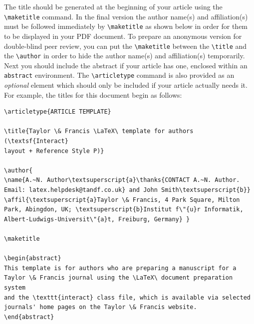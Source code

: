 \documentclass[]{interact}
\theoremstyle{plain}%
\theoremstyle{definition}
\theoremstyle{remark}
\begin{document}
The title should be generated at the beginning of your article using the \verb"\maketitle" command.
In the final version the author name(s) and affiliation(s) must be followed immediately by \verb"\maketitle" as shown below in order for them to be displayed in your PDF document.
To prepare an anonymous version for double-blind peer review, you can put the \verb"\maketitle" between the \verb"\title" and the \verb"\author" in order to hide the author name(s) and affiliation(s) temporarily.
Next you should include the abstract if your article has one, enclosed within an \texttt{abstract} environment.
The \verb"\articletype" command is also provided as an \emph{optional} element which should only be included if your article actually needs it.
For example, the titles for this document begin as follows:
\begin{verbatim}
\articletype{ARTICLE TEMPLATE}

\title{Taylor \& Francis \LaTeX\ template for authors (\textsf{Interact}
layout + Reference Style P)}

\author{
\name{A.~N. Author\textsuperscript{a}\thanks{CONTACT A.~N. Author.
Email: latex.helpdesk@tandf.co.uk} and John Smith\textsuperscript{b}}
\affil{\textsuperscript{a}Taylor \& Francis, 4 Park Square, Milton
Park, Abingdon, UK; \textsuperscript{b}Institut f\"{u}r Informatik,
Albert-Ludwigs-Universit\"{a}t, Freiburg, Germany} }

\maketitle

\begin{abstract}
This template is for authors who are preparing a manuscript for a
Taylor \& Francis journal using the \LaTeX\ document preparation system
and the \texttt{interact} class file, which is available via selected
journals' home pages on the Taylor \& Francis website.
\end{abstract}
\end{verbatim}
\end{document}
